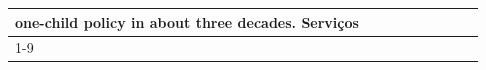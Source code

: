 \begin{table}[H]
\begin{tabular}{lllrlllll}
one-child policy in about three decades. Serviços \\
\cline{1-9}
\bottomrule
\end{tabular}
\end{table}
